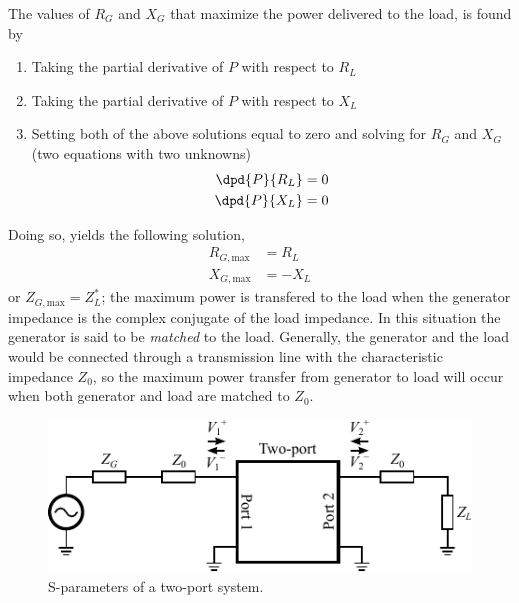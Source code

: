 The values of $R_G$ and $X_G$ that maximize the power delivered to the load, is found by 
\begin{enumerate}
\item Taking the partial derivative of $P$ with respect to $R_L$
\item Taking the partial derivative of $P$ with respect to $X_L$
\item Setting both of the above solutions equal to zero and solving for $R_G$ and $X_G$ (two equations with two unknowns)
    \begin{align}
        \dpd{P}{R_L} &= 0 \\
        \dpd{P}{X_L} &= 0
    \end{align}
\end{enumerate}
Doing so, yields the following solution,
\begin{equation}
    \begin{aligned}
        R_{G,\text{max}} &= R_L \\
        X_{G,\text{max}} &= -X_L
    \end{aligned}
\end{equation}
or $Z_{G,\text{max}} = Z^*_L$; the maximum power is transfered to the load when the generator impedance is the complex conjugate of the load impedance. In this situation the generator is said to be \emph{matched} to the load. Generally, the generator and the load would be connected through a transmission line with the characteristic impedance $Z_0$, so the maximum power transfer from generator to load will occur when both generator and load are matched to $Z_0$. 

\begin{figure}[htbp]
    \centering
    \includegraphics{img/analysis/s_parameter_twoport}
    \caption{S-parameters of a two-port system.}
    \label{fig:twoport}
\end{figure}

